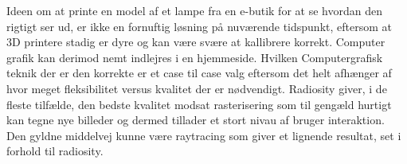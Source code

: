 Ideen om at printe en model af et lampe fra en e-butik for at se hvordan den rigtigt ser ud, er ikke en fornuftig løsning på nuværende tidspunkt, eftersom at 3D printere stadig er dyre og kan være svære at kallibrere korrekt. Computer grafik kan derimod nemt indlejres i en hjemmeside. Hvilken Computergrafisk teknik der er den korrekte er et case til case valg eftersom det helt afhænger af hvor meget fleksibilitet versus kvalitet der er nødvendigt. Radiosity giver, i de fleste tilfælde, den bedste kvalitet modsat rasterisering som til gengæld hurtigt kan tegne nye billeder og dermed tillader et stort nivau af bruger interaktion. Den gyldne middelvej kunne være raytracing som giver et lignende resultat, set i forhold til radiosity.